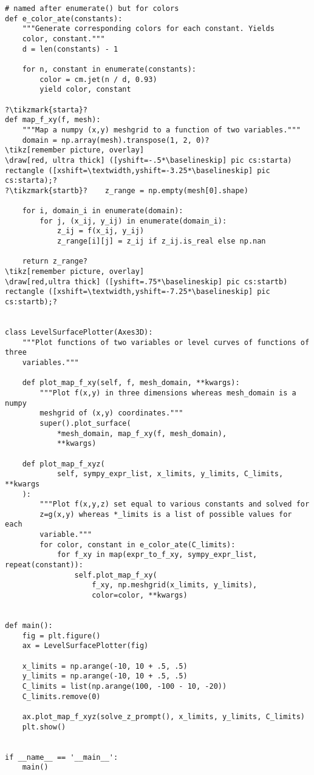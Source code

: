 \documentclass[11pt]{article}
\begin{document}
\begin{lstlisting}
# named after enumerate() but for colors
def e_color_ate(constants):
    """Generate corresponding colors for each constant. Yields
    color, constant."""
    d = len(constants) - 1

    for n, constant in enumerate(constants):
        color = cm.jet(n / d, 0.93)
        yield color, constant

?\tikzmark{starta}?
def map_f_xy(f, mesh):
    """Map a numpy (x,y) meshgrid to a function of two variables."""
    domain = np.array(mesh).transpose(1, 2, 0)?
\tikz[remember picture, overlay]
\draw[red, ultra thick] ([yshift=-.5*\baselineskip] pic cs:starta) rectangle ([xshift=\textwidth,yshift=-3.25*\baselineskip] pic cs:starta);?
?\tikzmark{startb}?    z_range = np.empty(mesh[0].shape)

    for i, domain_i in enumerate(domain):
        for j, (x_ij, y_ij) in enumerate(domain_i):
            z_ij = f(x_ij, y_ij)
            z_range[i][j] = z_ij if z_ij.is_real else np.nan

    return z_range?
\tikz[remember picture, overlay]
\draw[red,ultra thick] ([yshift=.75*\baselineskip] pic cs:startb) rectangle ([xshift=\textwidth,yshift=-7.25*\baselineskip] pic cs:startb);?


class LevelSurfacePlotter(Axes3D):
    """Plot functions of two variables or level curves of functions of three
    variables."""

    def plot_map_f_xy(self, f, mesh_domain, **kwargs):
        """Plot f(x,y) in three dimensions whereas mesh_domain is a numpy
        meshgrid of (x,y) coordinates."""
        super().plot_surface(
            *mesh_domain, map_f_xy(f, mesh_domain),
            **kwargs)

    def plot_map_f_xyz(
            self, sympy_expr_list, x_limits, y_limits, C_limits, **kwargs
    ):
        """Plot f(x,y,z) set equal to various constants and solved for
        z=g(x,y) whereas *_limits is a list of possible values for each
        variable."""
        for color, constant in e_color_ate(C_limits):
            for f_xy in map(expr_to_f_xy, sympy_expr_list, repeat(constant)):
                self.plot_map_f_xy(
                    f_xy, np.meshgrid(x_limits, y_limits),
                    color=color, **kwargs)


def main():
    fig = plt.figure()
    ax = LevelSurfacePlotter(fig)

    x_limits = np.arange(-10, 10 + .5, .5)
    y_limits = np.arange(-10, 10 + .5, .5)
    C_limits = list(np.arange(100, -100 - 10, -20))
    C_limits.remove(0)

    ax.plot_map_f_xyz(solve_z_prompt(), x_limits, y_limits, C_limits)
    plt.show()


if __name__ == '__main__':
    main()
\end{lstlisting}
\end{document}
